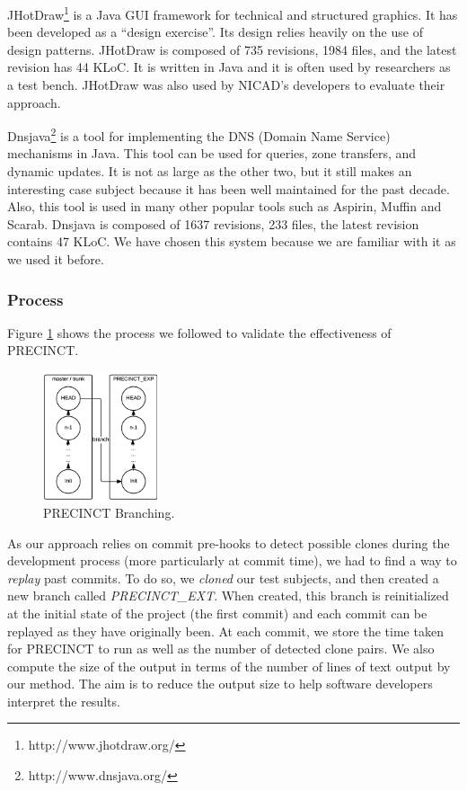 JHotDraw\footnote{http://www.jhotdraw.org/} is a Java GUI framework for technical and structured graphics.
It has been developed as a ``design exercise''. Its design relies heavily on the use of design patterns. JHotDraw is composed of 735 revisions, 1984 files, and the latest revision has 44 KLoC. It is written in Java and it is often used by researchers as a test bench. JHotDraw was also used by NICAD's developers to evaluate their approach.

Dnsjava\footnote{http://www.dnsjava.org/} is a tool for implementing the DNS (Domain Name Service) mechanisms in Java.
This tool can be used for queries, zone transfers, and dynamic updates.
It is not as large as the other two, but it still makes an interesting case subject because it has been well maintained for the past decade. Also, this tool is used in many other popular tools such as Aspirin, Muffin and
Scarab. Dnsjava is composed of 1637 revisions, 233 files, the latest revision contains 47 KLoC.
We have chosen this system because we are familiar with it as we used it before\cite{Nayrolles2015c}.

\subsubsection{Process}
\label{sub:Process}


Figure \ref{fig:precinct-branching} shows the process we followed to validate the effectiveness of PRECINCT.

\begin{figure}
  \centering
    \includegraphics[width=0.3\textwidth]{media/branch.png}
    \caption{PRECINCT Branching.\label{fig:precinct-branching}}
\end{figure}

As our approach relies on commit pre-hooks to detect possible clones during the development process (more particularly at commit time), we had to find a way to \textit{replay} past commits. To do so, we  \textit{cloned} our test subjects, and then created a new branch called \textit{PRECINCT\_EXT}.
When created, this branch is reinitialized at the initial state of the project (the first commit) and each commit can be replayed as they have originally been. At each commit, we store the time taken for PRECINCT to run as well as the number of detected clone pairs. We also compute the size of the output in terms of the number of lines of text output by our method. The aim is to reduce the output size to help software developers interpret the results.

